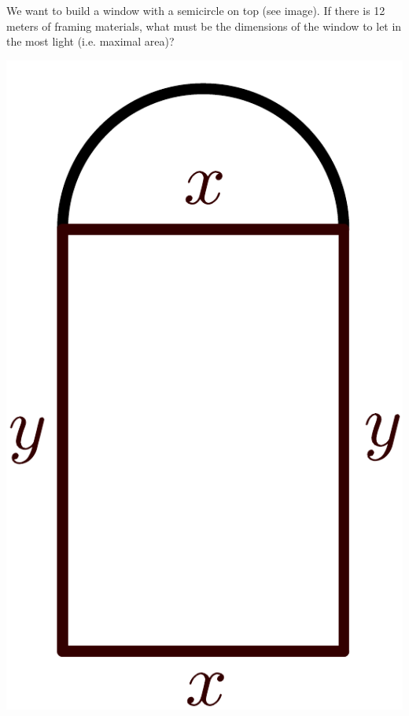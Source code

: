 \begin{minipage}{0.8\textwidth}
	\begin{exercise}
		We want to build a window with a semicircle on top (see image).
		If there is 12 meters of framing materials,
		what must be the dimensions of the window to let in the most light
		(i.e. maximal area)?
	\end{exercise}
\end{minipage}\hfill
\begin{minipage}{0.15\textwidth}
	\includegraphics[width=\textwidth]{images/window}
\end{minipage}\\
